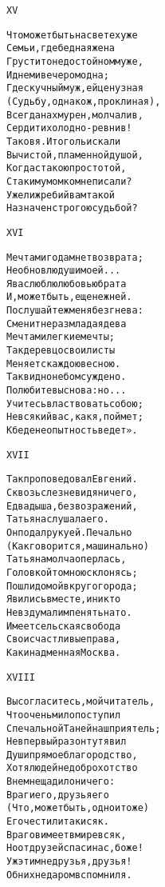 \begin{minipage}[t]{\dimexpr 0.5\textwidth -\tabcolsep-.5pt}
\begin{alltt}\normalfont\centering
XV

Что может быть на свете хуже
Семьи, где бедная жена
Грустит о недостойном муже,
И днем и вечером одна;
Где скучный муж, ей цену зная
(Судьбу, однако ж, проклиная),
Всегда нахмурен, молчалив,
Сердит и холодно-ревнив!
Таков я. И того ль искали
Вы чистой, пламенной душой,
Когда с такою простотой,
С таким умом ко мне писали?
Ужели жребий вам такой
Назначен строгою судьбой?
\end{alltt}
\end{minipage}

\begin{minipage}[t]{\dimexpr 0.5\textwidth -\tabcolsep-.5pt}
\begin{alltt}\normalfont\centering
XVI

Мечтам и годам нет возврата;
Не обновлю души моей...
Я вас люблю любовью брата
И, может быть, еще нежней.
Послушайте ж меня без гнева:
Сменит не раз младая дева
Мечтами легкие мечты;
Так деревцо свои листы
Меняет с каждою весною.
Так видно небом суждено.
Полюбите вы снова: но...
Учитесь властвовать собою;
Не всякий вас, как я, поймет;
К беде неопытность ведет».
\end{alltt}
\end{minipage}
\clearpage

\begin{minipage}[t]{\dimexpr 0.5\textwidth -\tabcolsep-.5pt}
\begin{alltt}\normalfont\centering
XVII

Так проповедовал Евгений.
Сквозь слез не видя ничего,
Едва дыша, без возражений,
Татьяна слушала его.
Он подал руку ей. Печально
(Как говорится, машинально)
Татьяна молча оперлась,
Головкой томною склонясь;
Пошли домой вкруг огорода;
Явились вместе, и никто
Не вздумал им пенять на то.
Имеет сельская свобода
Свои счастливые права,
Как и надменная Москва.
\end{alltt}
\end{minipage}

\begin{minipage}[t]{\dimexpr 0.5\textwidth -\tabcolsep-.5pt}
\begin{alltt}\normalfont\centering
XVIII

Вы согласитесь, мой читатель,
Что очень мило поступил
С печальной Таней наш приятель;
Не в первый раз он тут явил
Души прямое благородство,
Хотя людей недоброхотство
В нем не щадило ничего:
Враги его, друзья его
(Что, может быть, одно и то же)
Его честили так и сяк.
Врагов имеет в мире всяк,
Но от друзей спаси нас, боже!
Уж эти мне друзья, друзья!
Об них недаром вспомнил я.
\end{alltt}
\end{minipage}
\clearpage

